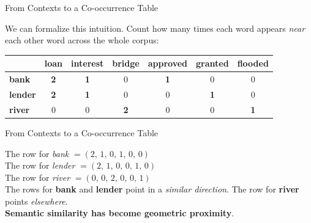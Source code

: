\documentclass[aspectratio=169]{beamer}
\begin{document}
%
\begin{frame}{From Contexts to a Co-occurrence Table}

We can formalize this intuition.
Count how many times each word appears \emph{near}
each other word across the whole corpus:

\begin{center}
\renewcommand{\arraystretch}{1.25}
\begin{tabular}{l | c c c c c c}
             & loan & interest & bridge & approved & granted & flooded \\
\hline
\textbf{bank}   & \textcolor{blue!70}{\textbf{2}} & \textcolor{blue!70}{\textbf{1}} & 0 & \textcolor{blue!50}{\textbf{1}} & 0 & 0 \\
\textbf{lender} & \textcolor{blue!70}{\textbf{2}} & \textcolor{blue!70}{\textbf{1}} & 0 & 0 & \textcolor{blue!50}{\textbf{1}} & 0 \\
\textbf{river}  & 0 & 0 & \textcolor{red!70}{\textbf{2}} & 0 & 0 & \textcolor{red!70}{\textbf{1}} \\
\end{tabular}
\end{center}
\end{frame}
%
%
\begin{frame}{From Contexts to a Co-occurrence Table}

\begin{tcolorbox}[colback=green!5!white, colframe=green!60!black,
  title=\textbf{Each row is already a vector representation!}]
The row for \emph{bank} $= (2,\,1,\,0,\,1,\,0,\,0)$\\
The row for \emph{lender} $= (2,\,1,\,0,\,0,\,1,\,0)$\\
The row for \emph{river} $= (0,\,0,\,2,\,0,\,0,\,1)$\\[6pt]
The rows for \textbf{bank} and \textbf{lender}
point in a \emph{similar direction}.
The row for \textbf{river} points \emph{elsewhere}.\\[4pt]
\textbf{Semantic similarity has become geometric proximity}.
\end{tcolorbox}

\end{frame}
%
%
\end{document}
